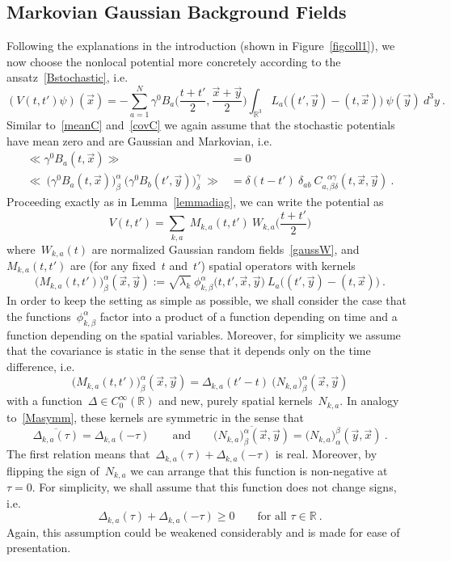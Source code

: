 \documentclass[reqno,11pt]{amsart}
\numberwithin{equation}{section}
\newcommand{\beq}{\begin{equation}}
\newcommand{\eeq}{\end{equation}}
\newcommand{\bbra}{\mathopen{\ll}}
\newcommand{\kket}{\mathclose{\gg}}
\newcommand{\R}{\mathbb{R}}
\newcommand{\1}{\mathds{1}}
\begin{document}
\subsection{Markovian Gaussian Background Fields} \label{secmarkov}
Following the explanations in the introduction (shown in Figure~\ref{figcoll1}),
we now choose the nonlocal potential more concretely according to the ansatz~\eqref{Bstochastic}, i.e.\
\[ %
(V(t,t') \psi)(\vec{x}) = -\sum_{a=1}^N \gamma^0 B_a\Big( \frac{t+ t'}{2} , \frac{\vec{x}+\vec{y}}{2} \Big) 
\int_{\R^3} L_a\big( (t', \vec{y}) - (t,\vec{x}) \big)\: \psi(\vec{y})\: d^3y \:. \]
Similar to~\eqref{meanC} and~\eqref{covC} we again
assume that the stochastic potentials have mean zero and are Gaussian and Markovian, i.e.\
\begin{align}
\bbra \gamma^0 B_a (t, \vec{x}) \kket &= 0 \label{markov1} \\
\bbra \:\big(\gamma^0 B_a(t, \vec{x}) \big)^\alpha_\beta\: 
\big( \gamma^0 B_b(t',\vec{y}) \big)^\gamma_\delta \:\kket &= \delta(t-t')\: \delta_{ab}\:
C^{\;\:\,\alpha \gamma}_{a, \beta \delta}(t, \vec{x}, \vec{y}) \:. \label{markov2}
\end{align}
Proceeding exactly as in Lemma~\ref{lemmadiag}, we can write the potential as
\beq \label{Vrep2}
V(t,t') = \sum_{k,a} \: M_{k,a}(t,t')\: W_{k,a}\Big( \frac{t+t'}{2} \Big)
\eeq
where~$W_{k,a}(t)$ are normalized Gaussian random fields~\eqref{gaussW},
and~$M_{k,a}(t,t')$ are (for any fixed~$t$ and~$t'$) spatial operators with kernels
\[ %
\big(M_{k,a}(t,t') \big)^\alpha_\beta(\vec{x}, \vec{y}) := \sqrt{\lambda_k}\: 
\phi^{\alpha}_{k, \beta}\big( t, t', \vec{x}, \vec{y} \big) \: L_a\big( (t', \vec{y}) - (t,\vec{x}) \big)\:. \]
In order to keep the setting as simple as possible, we shall consider the case that the functions~$\phi^{\alpha}_{k, \beta}$
factor into a product of a function depending on time and a function depending on the spatial variables.
Moreover, for simplicity we assume that the covariance is static in the sense that it depends only on the time difference, i.e.\
\beq \label{Deltadef}
\big(M_{k,a}(t,t') \big)^\alpha_\beta(\vec{x}, \vec{y}) = \Delta_{k,a}(t'-t)\:
\big(N_{k,a}\big)^\alpha_\beta(\vec{x}, \vec{y})
\eeq
with a function~$\Delta \in C^\infty_0(\R)$ and new, purely spatial kernels~$N_{k,a}$.
In analogy to~\eqref{Masymm}, these kernels are symmetric in the sense that
\[ \overline{\Delta_{k,a}(\tau)} = \Delta_{k,a}(-\tau)\qquad \text{and} \qquad \overline{\big(N_{k,a}\big)^\alpha_\beta(\vec{x}, \vec{y})} = 
\big(N_{k,a}\big)^\beta_\alpha(\vec{y}, \vec{x}) \:. \]
The first relation means that~$\Delta_{k,a}(\tau) + \Delta_{k,a}(-\tau)$ is real.
Moreover, by flipping the sign of~$N_{k,a}$ we can arrange that this function is non-negative
at~$\tau=0$. For simplicity, we shall assume that this function does not change signs, i.e.\
\beq \label{Deltapos}
\Delta_{k,a}(\tau) + \Delta_{k,a}(-\tau) \geq 0 \qquad \text{for all~$\tau \in \R$}\:.
\eeq
Again, this assumption could be weakened considerably and is made for ease of presentation.
\end{document}
